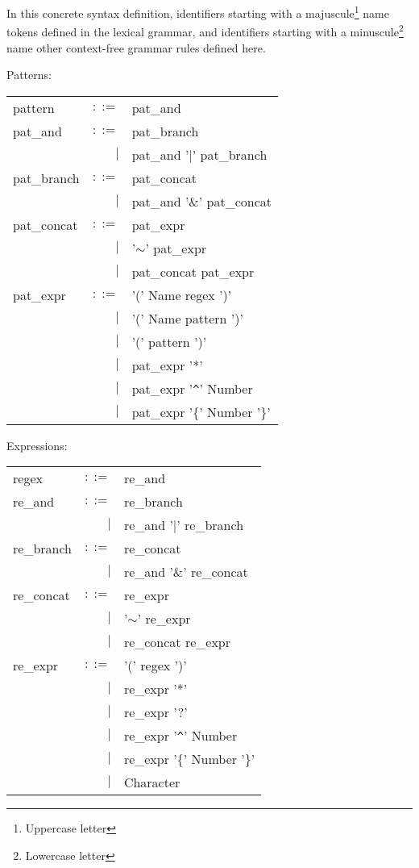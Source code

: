 \begin{defn}
   \label{defn-gram-cfg}

   In this concrete syntax definition, identifiers starting with a
   majuscule\footnote{Uppercase letter} name tokens defined in the lexical
   grammar, and identifiers starting with a minuscule\footnote{Lowercase letter}
   name other context-free grammar rules defined here.

   \needspace{5cm}

   Patterns:

   \begin{tabular}{lrl}
      pattern		& $::=$	& pat\_and			\\
      pat\_and		& $::=$	& pat\_branch			\\
      			& $|$	& pat\_and '$|$' pat\_branch	\\
      pat\_branch	& $::=$	& pat\_concat			\\
      			& $|$	& pat\_and '\&' pat\_concat	\\
      pat\_concat	& $::=$	& pat\_expr			\\
			& $|$	& '$\sim$' pat\_expr		\\
			& $|$	& pat\_concat pat\_expr		\\
      pat\_expr		& $::=$	& '(' Name regex ')'		\\
			& $|$	& '(' Name pattern ')'		\\
			& $|$	& '(' pattern ')'		\\
			& $|$	& pat\_expr '*'			\\
                        & $|$	& pat\_expr '\verb!^!' Number	\\
                        & $|$	& pat\_expr '\{' Number '\}'	\\
   \end{tabular}

   \needspace{5cm}
   Expressions:

   \begin{tabular}{lrl}
      regex		& $::=$	& re\_and			\\
      re\_and		& $::=$	& re\_branch			\\
      			& $|$	& re\_and '$|$' re\_branch	\\
      re\_branch	& $::=$	& re\_concat			\\
      			& $|$	& re\_and '\&' re\_concat	\\
      re\_concat	& $::=$	& re\_expr			\\
			& $|$	& '$\sim$' re\_expr		\\
			& $|$	& re\_concat re\_expr		\\
      re\_expr		& $::=$	& '(' regex ')'			\\
			& $|$	& re\_expr '*'			\\
			& $|$	& re\_expr '?'			\\
                        & $|$	& re\_expr '\verb!^!' Number	\\
                        & $|$	& re\_expr '\{' Number '\}'	\\
                        & $|$	& Character			\\
   \end{tabular}
\end{defn}

